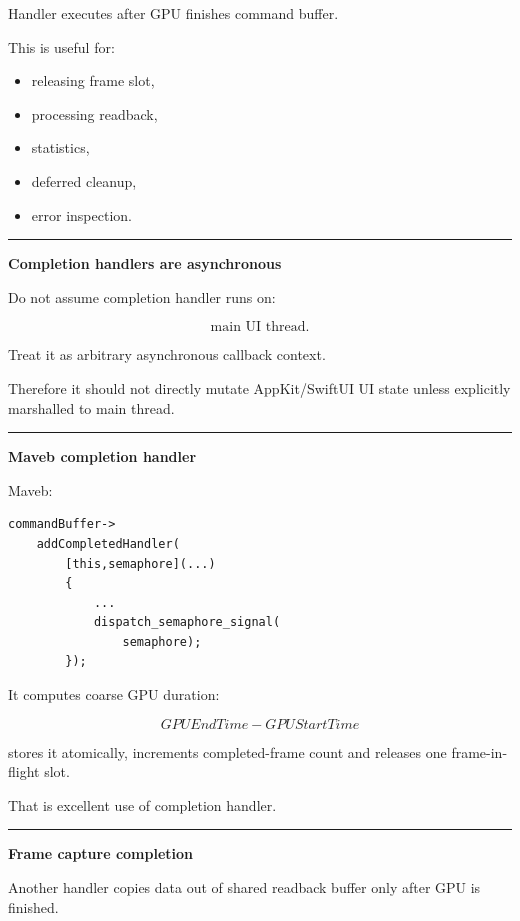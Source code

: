 Handler executes after GPU finishes command buffer.

This is useful for:

\begin{itemize}
\tightlist
\item
  releasing frame slot,
\item
  processing readback,
\item
  statistics,
\item
  deferred cleanup,
\item
  error inspection.
\end{itemize}

\begin{center}\rule{0.5\linewidth}{0.5pt}\end{center}

\textbf{Completion handlers are asynchronous}

Do not assume completion handler runs on:

\[
\text{main UI thread}.
\]

Treat it as arbitrary asynchronous callback context.

Therefore it should not directly mutate AppKit/SwiftUI UI state unless explicitly marshalled to main thread.

\begin{center}\rule{0.5\linewidth}{0.5pt}\end{center}

\textbf{Maveb completion handler}

Maveb:

\begin{verbatim}
commandBuffer->
    addCompletedHandler(
        [this,semaphore](...)
        {
            ...
            dispatch_semaphore_signal(
                semaphore);
        });
\end{verbatim}

It computes coarse GPU duration:

\[
GPUEndTime-GPUStartTime
\]

stores it atomically, increments completed-frame count and releases one frame-in-flight slot.

That is excellent use of completion handler.

\begin{center}\rule{0.5\linewidth}{0.5pt}\end{center}

\textbf{Frame capture completion}

Another handler copies data out of shared readback buffer only after GPU is finished.

